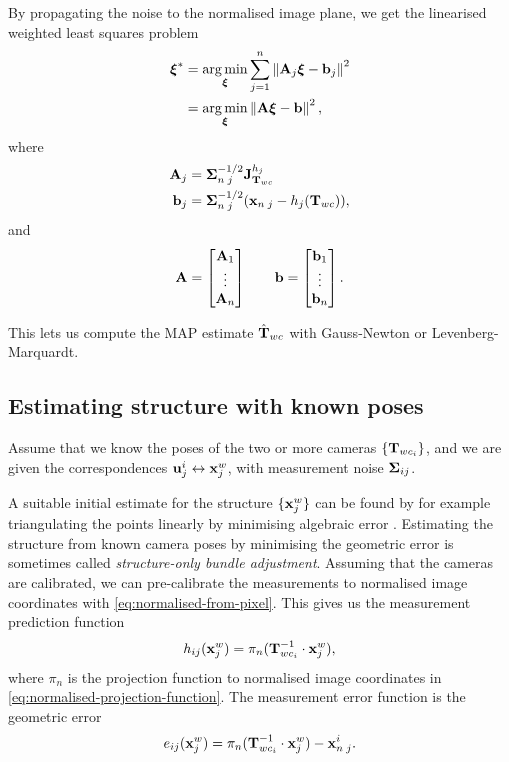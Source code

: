 By propagating the noise to the normalised image plane, we get the linearised weighted least squares problem
\begin{align}
  {\boldsymbol{\mathbf{\xi}}}^\ast &= \operatorname*{arg\,min}_{{\boldsymbol{\mathbf{\xi}}}} \sum^n_{j=1} \left\lVert {\boldsymbol{\mathbf{A}}}_j {\boldsymbol{\mathbf{\xi}}} - {\boldsymbol{\mathbf{b}}}_j\right\rVert^2\\
  &= \operatorname*{arg\,min}_{{\boldsymbol{\mathbf{\xi}}}} \left\lVert {\boldsymbol{\mathbf{A}}} {\boldsymbol{\mathbf{\xi}}} - {\boldsymbol{\mathbf{b}}}\right\rVert^2,
\end{align}
where
\begin{align}
  {\boldsymbol{\mathbf{A}}}_j &= {\boldsymbol{\mathbf{\Sigma}}}^{-1/2}_{n \; j} {{\boldsymbol{\mathbf{J}}}^{h_j}_{{\boldsymbol{\mathbf{T}}}_{wc}}}\\
  {\boldsymbol{\mathbf{b}}}_j &= {\boldsymbol{\mathbf{\Sigma}}}^{-1/2}_{n \; j} ({\boldsymbol{\mathbf{x}}}_{n \; j} - h_j({\boldsymbol{\mathbf{T}}}_{wc})),
\end{align}
and
\begin{equation}
  {\boldsymbol{\mathbf{A}}} =  
  \begin{bmatrix}
    {\boldsymbol{\mathbf{A}}}_1\\
    \vdots\\
    {\boldsymbol{\mathbf{A}}}_n
  \end{bmatrix}
  \qquad
  {\boldsymbol{\mathbf{b}}} =  
  \begin{bmatrix}
    {\boldsymbol{\mathbf{b}}}_1\\
    \vdots\\
    {\boldsymbol{\mathbf{b}}}_n
  \end{bmatrix}.
\end{equation}

This lets us compute the MAP estimate $\hat{{\boldsymbol{\mathbf{T}}}}_{wc}$ with Gauss-Newton or Levenberg-Marquardt.

\subsection{Estimating structure with known poses}
Assume that we know the poses of the two or more cameras $\{ {\boldsymbol{\mathbf{T}}}_{wc_i}\}$, and we are given the correspondences ${\boldsymbol{\mathbf{u}}}^i_j \leftrightarrow {\boldsymbol{\mathbf{x}}}^w_j$, with measurement noise ${\boldsymbol{\mathbf{\Sigma}}}_{ij}$.

A suitable initial estimate for the structure $\{ {\boldsymbol{\mathbf{x}}}^w_j \}$ can be found by for example triangulating the points linearly by minimising algebraic error \cite{Hartley2004MultipleVision}.
Estimating the structure from known camera poses by minimising the geometric error is sometimes called \emph{structure-only bundle adjustment}.
Assuming that the cameras are calibrated, we can pre-calibrate the measurements to normalised image coordinates with \eqref{eq:normalised-from-pixel}.
This gives us the measurement prediction function
\begin{equation}
  h_{ij}({\boldsymbol{\mathbf{x}}}^w_j) = \pi_n({\boldsymbol{\mathbf{T}}}_{wc_i}^{-1} \cdot {\boldsymbol{\mathbf{x}}}^w_j),
\end{equation}
where $\pi_n$ is the projection function to normalised image coordinates in \eqref{eq:normalised-projection-function}.
The measurement error function is the geometric error
\begin{equation}
  e_{ij}({\boldsymbol{\mathbf{x}}}^w_j) = \pi_n({\boldsymbol{\mathbf{T}}}_{wc_i}^{-1} \cdot {\boldsymbol{\mathbf{x}}}^w_j) - {\boldsymbol{\mathbf{x}}}_{n \; j}^i.
\end{equation}


